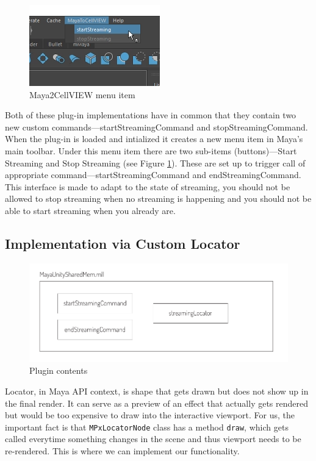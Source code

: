 \documentclass[
  digital, %
  table,   %
  nolof,     %
  nolot,     %
]{fithesis3}
\begin{document}
\begin{figure}
  \centering
  \includegraphics{images/maya-to-unity-menu.png}
  \caption{Maya2CellVIEW menu item}
  \label{fig:maya-menu-item}
\end{figure}

Both of these plug-in implementations have in common that they contain two new custom commands—startStreamingCommand and stopStreamingCommand. When the plug-in is loaded and intialized it creates a new menu item in Maya's main toolbar. Under this menu item there are two sub-items (buttons)—Start Streaming and Stop Streaming (see Figure \ref{fig:maya-menu-item}). These are set up to trigger call of appropriate command—startStreamingCommand and endStreamingCommand. This interface is made to adapt to the state of streaming, you should not be allowed to stop streaming when no streaming is happening and you should not be able to start streaming when you already are.

\subsection{Implementation via Custom Locator}
\begin{figure}
  \centering
  \includegraphics[scale=0.8]{images/plugin-contents.pdf}
  \caption{Plugin contents}
  \label{fig:plugin-content}
\end{figure}
Locator, in Maya API context, is shape that gets drawn but does not show up in the final render. It can serve as a preview of an effect that actually gets rendered but would be too expensive to draw into the interactive viewport. For us, the important fact is that \texttt{MPxLocatorNode} class has a method \texttt{draw}, which gets called everytime something changes in the scene and thus viewport needs to be re-rendered. This is where we can implement our functionality.
\end{document}

